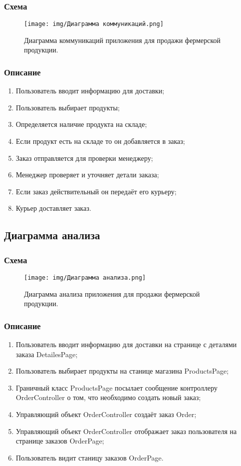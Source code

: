 \documentclass[a4paper]{report}
\begin{document}
\subsubsection{Схема}
\begin{figure}[H]
    \centering
    \texttt{[image: img/Диаграмма коммуникаций.png]}
    \caption{Диаграмма коммуникаций приложения для продажи фермерской продукции.}
\end{figure}
\subsubsection{Описание}
\begin{enumerate}
    \item Пользователь вводит информацию для доставки;
    \item Пользователь выбирает продукты;
    \item Определяется наличие продукта на складе;
    \item Если продукт есть на складе то он добавляется в заказ;
    \item Заказ отправляется для проверки менеджеру;
    \item Менеджер проверяет и уточняет детали заказа;
    \item Если заказ действительный он передаёт его курьеру;
    \item Курьер доставляет заказ.
\end{enumerate}

\newpage

\subsection{Диаграмма анализа}
\subsubsection{Схема}
\begin{figure}[H]
    \centering
    \texttt{[image: img/Диаграмма анализа.png]}
    \caption{Диаграмма анализа приложения для продажи фермерской продукции.}
\end{figure}
\subsubsection{Описание}
\begin{enumerate}
    \item Пользователь вводит информацию для доставки на странице с деталями заказа DetailesPage;
    \item Пользователь выбирает продукты на станице магазина ProductsPage;
    \item Граничный класс ProductsPage посылает сообщение контроллеру OrderController о том, что необходимо создать новый заказ;
    \item Управляющий объект OrderController создаёт заказ Order;
    \item Управляющий объект OrderController отображает заказ пользователя на странице заказов OrderPage;
    \item Пользователь видит станицу заказов OrderPage.
\end{enumerate}
\end{document}

